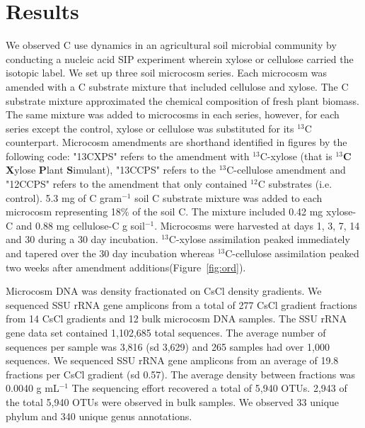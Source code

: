 \section{Results}
We observed C use dynamics in an agricultural soil microbial community by
conducting a nucleic acid SIP experiment wherein xylose or cellulose carried
the isotopic label. We set up three soil microcosm series. Each microcosm was
amended with a C substrate mixture that included cellulose and xylose. The
C substrate mixture approximated the chemical composition of fresh
plant biomass. The same mixture was added to microcosms in each series,
however, for each series except the control, xylose or cellulose was
substituted for its $^{13}$C counterpart. Microcosm amendments are shorthand
identified in figures by the following code: "13CXPS" refers to
the amendment with $^{13}$C-xylose (that is $^{13}$\textbf{C} \textbf{X}ylose
\textbf{P}lant \textbf{S}imulant), "13CCPS" refers to the $^{13}$C-cellulose
amendment and "12CCPS" refers to the amendment that only contained $^{12}$C
substrates (i.e. control). 5.3 mg of C gram$^{-1}$ soil C substrate mixture was
added to each microcosm representing 18\% of the soil C. The mixture included
0.42 mg xylose-C and 0.88 mg cellulose-C g soil$^{-1}$. Microcosms were
harvested at days 1, 3, 7, 14 and 30 during a 30 day
incubation. $^{13}$C-xylose assimilation peaked immediately and tapered over
the 30 day incubation whereas $^{13}$C-cellulose assimilation peaked two weeks
after amendment additions(Figure~\ref{fig:ord}). 

Microcosm DNA was density fractionated on CsCl density gradients. We sequenced
SSU rRNA gene amplicons from a total of 277 CsCl gradient fractions from 14
CsCl gradients and 12 bulk microcosm DNA samples. The SSU rRNA gene data set
contained 1,102,685 total sequences. The average number of sequences per sample
was 3,816 (sd 3,629) and 265 samples had over 1,000 sequences. We sequenced SSU
rRNA gene amplicons from an average of
19.8 fractions per CsCl gradient (sd 0.57). The average density between
fractions was  0.0040 g mL$^{-1}$ The sequencing effort recovered a total of
5,940 OTUs. 2,943 of the total 5,940 OTUs were observed in bulk samples. We
observed 33 unique phylum and 340 unique genus annotations.


